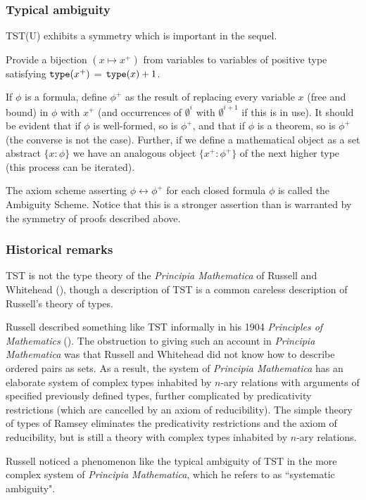 \documentclass[112pt]{article}
\begin{document}
\subsubsection{Typical ambiguity}

TST(U) exhibits a symmetry which is important in the sequel.

Provide a bijection $(x \mapsto x^+)$ from variables to variables of positive type satisfying   ${\tt type}(x^+)$ = ${\tt type}(x)+1$.

If $\phi$ is a formula, define $\phi^+$ as the result of replacing every variable $x$ (free and bound) in $\phi$ with $x^+$ (and occurrences of $\emptyset^i$ with $\emptyset^{i+1}$ if this is in use).   It should be evident that if $\phi$ is well-formed, so is $\phi^+$,
and that if $\phi$ is a theorem, so is $\phi^+$ (the converse is not the case).  Further, if we define a mathematical object as a set abstract $\{x:\phi\}$ we have an analogous
object $\{x^+:\phi^+\}$ of the next higher type (this process can be iterated).

The axiom scheme asserting $\phi \leftrightarrow \phi^+$ for each closed formula $\phi$ is called the Ambiguity Scheme.   Notice that this is a stronger assertion than is warranted by the symmetry of proofs described above.

\subsubsection{Historical remarks}

TST is not the type theory of the {\em Principia Mathematica\/} of Russell and Whitehead (\cite{pm}), though a description of TST is a common careless description of Russell's theory of types.

Russell described something like TST informally in his 1904 {\em Principles of Mathematics\/} (\cite{pm1}).  The obstruction to giving such an account in {\em Principia Mathematica\/} was that
Russell and Whitehead did not know how to describe ordered pairs as sets.  As a result, the system of {\em Principia Mathematica\/} has an elaborate system of  complex
types inhabited by $n$-ary relations with arguments of specified previously defined types, further complicated by predicativity restrictions (which are cancelled by an axiom of reducibility).
The simple theory of types of Ramsey eliminates the predicativity restrictions and the axiom of reducibility, but is still a theory with complex types inhabited by $n$-ary relations.

Russell noticed a phenomenon like the typical ambiguity of TST in the more complex system of {\em Principia Mathematica\/}, which he refers to as ``systematic ambiguity".
\end{document}
